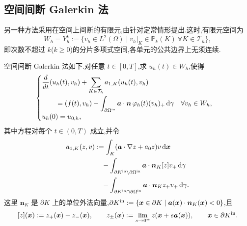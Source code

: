 \subsection{空间间断 Galerkin 法}\label{sec:14.3.3}

另一种方法采用在空间上间断的有限元,由针对定常情形提出.这时,有限元空间为
\[
  W_h=Y_h^k:=\{v_h\in L^2(\Omega)\mid v_h|_K\in\mathbb P_k(K)
                  \ \forall K\in\mathcal T_h\},
\]
即次数不超过 \(k\)(\(k\ge0\))的分片多项式空间,各单元的公共边界上无须连续.

空间间断 Galerkin 法如下.对任意 \(t\in[0,T]\),求 \(u_h(t)\in W_h\),使得
\begin{equation}\label{eq:14.3.23}
  \begin{cases}
    \begin{aligned}
      &\dfrac{d}{dt}(u_h(t),v_h)+\displaystyle\sum_{K\in\mathcal T_h}a_{1,K}(u_h(t),v_h)\\
      &\qquad=(f(t),v_h)
        -\displaystyle\int_{\partial\Omega^{\rm in}}\boldsymbol{a}\cdot\boldsymbol{n}\,
              \varphi_h(t)(v_h)_+\,\mathrm d\gamma
           \quad\forall v_h\in W_h,
    \end{aligned}\\[2pt]
    u_h(0)=u_{0,h},
  \end{cases}
\end{equation}
其中方程对每个 \(t\in(0,T)\) 成立,并令
\[
  \begin{aligned}
    a_{1,K}(z,v)
      &:=\int_K(\boldsymbol{a}\cdot\nabla z+a_0z)v\,\mathrm d\boldsymbol{x}\\
      &\quad-\int_{\partial K^{\rm in}\setminus\partial\Omega^{\rm in}}
             \boldsymbol{a}\cdot\boldsymbol{n}_K[z]v_+\,\mathrm d\gamma\\
      &\quad-\int_{\partial K^{\rm in}\cap\partial\Omega^{\rm in}}
             \boldsymbol{a}\cdot\boldsymbol{n}_K z_+v_+\,\mathrm d\gamma.
  \end{aligned}
\]
这里 \(\boldsymbol{n}_K\) 是 \(\partial K\) 上的单位外法向量,\(\partial K^{\rm in}:=\{\boldsymbol{x}\in\partial K\mid\boldsymbol{a}(\boldsymbol{x})\cdot\boldsymbol{n}_K(\boldsymbol{x})<0\}\),且
\[
  [z](\boldsymbol{x}):=z_+(\boldsymbol{x})-z_-(\boldsymbol{x}),\qquad
  z_\pm(\boldsymbol{x}):=\lim_{s\to0^\pm}z(\boldsymbol{x}+s\boldsymbol{a}(\boldsymbol{x})),
  \qquad \boldsymbol{x}\in\partial K^{\rm in}.
\]

